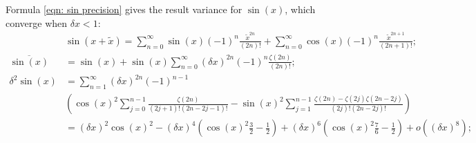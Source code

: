 \documentclass[twoside]{article}
\numberwithin{equation}{section}
\begin{document}
Formula \eqref{eqn: sin precision} gives the result variance for $\sin(x)$, which converge when $\delta x < 1$:
\begin{align}
\label{eqn: sin Taylor}
& \sin(x + \tilde{x}) = \sum_{n=0}^{\infty} \sin(x) (-1)^{n} \frac{\tilde{x}^{2n}}{(2n)!} + \sum_{n=0}^{\infty} \cos(x) (-1)^n \frac{\tilde{x}^{2n+1}}{(2n + 1)!}; \\
\overline{\sin(x)} &= \sin(x) + \sin(x) \sum_{n=0}^{\infty} (\delta x)^{2n} (-1)^{n} \frac{\zeta(2n)}{(2n)!}; \\
\label{eqn: sin precision}
\delta^2 \sin(x) &= \sum_{n=1}^{\infty} (\delta x)^{2n} (-1)^{n - 1} \\
 & \left( \cos(x)^2 \sum_{j=0}^{n-1} \frac{\zeta(2n)}{(2j+1)!(2n-2j-1)!}
      - \sin(x)^2 \sum_{j=1}^{n-1} \frac{\zeta(2n) - \zeta(2j) \zeta(2n-2j)}{(2j)!(2n-2j)!} \right) \nonumber \\ 
 &=  (\delta x)^2 \cos(x)^2 - (\delta x)^4 (\cos(x)^2 \frac{3}{2} - \frac{1}{2}) + (\delta x)^6 (\cos(x)^2 \frac{7}{6} - \frac{1}{2})  + o((\delta x)^8);
\end{align}
\end{document}
